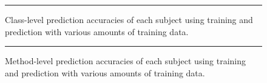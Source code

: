 \begin{figure}[!ht]
  \centering
  \begin{adjustbox}{max size={.95\textwidth}{.95\textheight}}
    
  \end{adjustbox}
  \caption{Class-level prediction accuracies of each subject using training and prediction with various amounts of training data.}
  \vspace{2mm}
  \hrule
  \label{fig:divisor_class_graph}
\end{figure}

\begin{figure}[!ht]
  \centering
  \begin{adjustbox}{max size={.95\textwidth}{.95\textheight}}
    
  \end{adjustbox}
  \caption{Method-level prediction accuracies of each subject using training and prediction with various amounts of training data.}
  \vspace{2mm}
  \hrule
  \label{fig:divisor_method_graph}
\end{figure}


